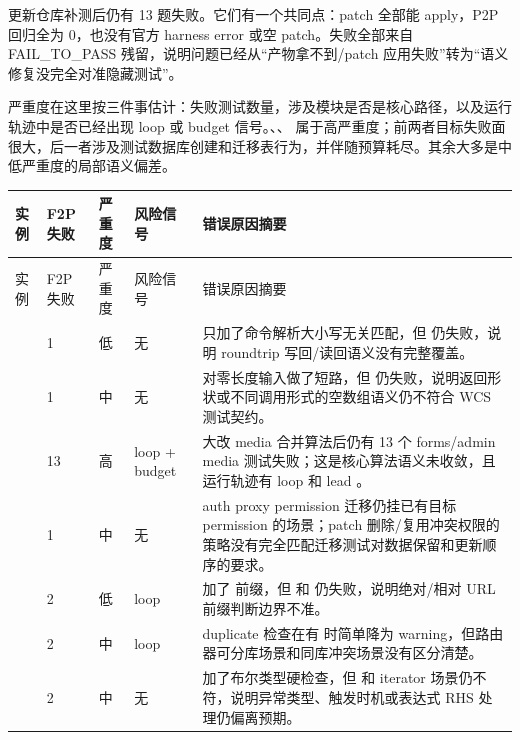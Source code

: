 \documentclass[UTF8,a4paper,11pt]{ctexart}
\begin{document}
更新仓库补测后仍有 13 题失败。它们有一个共同点：patch 全部能 apply，P2P 回归全为 0，也没有官方 harness error 或空 patch。失败全部来自 FAIL\_TO\_PASS 残留，说明问题已经从“产物拿不到/patch 应用失败”转为“语义修复没完全对准隐藏测试”。

严重度在这里按三件事估计：失败测试数量，涉及模块是否是核心路径，以及运行轨迹中是否已经出现 loop 或 budget 信号。、、 属于高严重度；前两者目标失败面很大，后一者涉及测试数据库创建和迁移表行为，并伴随预算耗尽。其余大多是中低严重度的局部语义偏差。

\begin{center}
{\scriptsize
\setlength{\tabcolsep}{2pt}
\begin{longtable}{L{3.3cm} C{1.0cm} C{1.0cm} L{3.1cm} L{6.0cm}}
\toprule
实例 & F2P 失败 & 严重度 & 风险信号 & 错误原因摘要 \\
\midrule
\endfirsthead
\toprule
实例 & F2P 失败 & 严重度 & 风险信号 & 错误原因摘要 \\
\midrule
\endhead
{} & 1 & 低 & 无 &  只加了命令解析大小写无关匹配，但  仍失败，说明 roundtrip 写回/读回语义没有完整覆盖。 \\
 & 1 & 中 & 无 &  对零长度输入做了短路，但  仍失败，说明返回形状或不同调用形式的空数组语义仍不符合 WCS 测试契约。 \\
 & 13 & 高 & loop + budget &  大改 media 合并算法后仍有 13 个 forms/admin media 测试失败；这是核心算法语义未收敛，且运行轨迹有  loop 和 lead 。 \\
 & 1 & 中 & 无 & auth proxy permission 迁移仍挂已有目标 permission 的场景；patch 删除/复用冲突权限的策略没有完全匹配迁移测试对数据保留和更新顺序的要求。 \\
 & 2 & 低 & loop &  加了  前缀，但  和  仍失败，说明绝对/相对 URL 前缀判断边界不准。 \\
 & 2 & 中 & loop & duplicate  检查在有  时简单降为 warning，但路由器可分库场景和同库冲突场景没有区分清楚。 \\
 & 2 & 中 & 无 &  加了布尔类型硬检查，但  和 iterator 场景仍不符，说明异常类型、触发时机或表达式 RHS 处理仍偏离预期。 \\

\end{longtable}}
\end{center}
\end{document}
